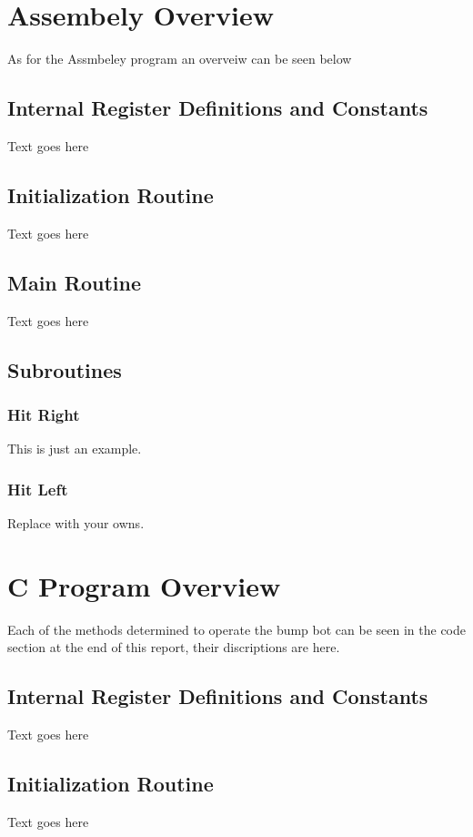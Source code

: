 \documentclass[12pt,letterpaper]{article}
\begin{document}
\section{Assembely Overview}
As for the Assmbeley program an overveiw can be seen below


\subsection{Internal Register Definitions and Constants}
Text goes here

\subsection{Initialization Routine}
Text goes here

\subsection{Main Routine}
Text goes here

\subsection{Subroutines}
	\subsubsection{Hit Right}
	This is just an example.
	
	\subsubsection{Hit Left}
	Replace with your owns.

\section{C Program Overview}
Each of the methods determined to operate the bump bot can be seen in the code section at the end of this report, their discriptions are here.

\subsection{Internal Register Definitions and Constants}
Text goes here

\subsection{Initialization Routine}
Text goes here
\end{document}
